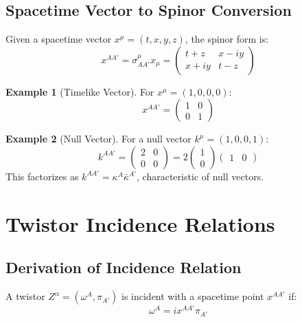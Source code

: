 \documentclass[12pt,a4paper]{article}
\theoremstyle{definition}
\newtheorem{example}{Example}[section]
\begin{document}
\subsection{Spacetime Vector to Spinor Conversion}

Given a spacetime vector $x^\mu = (t, x, y, z)$, the spinor form is:
\begin{equation}
x^{AA'} = \sigma^\mu_{AA'} x_\mu = \begin{pmatrix} t+z & x-iy \\ x+iy & t-z \end{pmatrix}
\end{equation}

\begin{example}[Timelike Vector]
For $x^\mu = (1, 0, 0, 0)$:
\begin{equation}
x^{AA'} = \begin{pmatrix} 1 & 0 \\ 0 & 1 \end{pmatrix}
\end{equation}
\end{example}

\begin{example}[Null Vector]
For a null vector $k^\mu = (1, 0, 0, 1)$:
\begin{equation}
k^{AA'} = \begin{pmatrix} 2 & 0 \\ 0 & 0 \end{pmatrix} = 2\begin{pmatrix} 1 \\ 0 \end{pmatrix} \begin{pmatrix} 1 & 0 \end{pmatrix}
\end{equation}
This factorizes as $k^{AA'} = \kappa^A \bar{\kappa}^{A'}$, characteristic of null vectors.
\end{example}

\section{Twistor Incidence Relations}

\subsection{Derivation of Incidence Relation}

A twistor $Z^\alpha = (\omega^A, \pi_{A'})$ is incident with a spacetime point $x^{AA'}$ if:
\begin{equation}
\omega^A = ix^{AA'}\pi_{A'}
\end{equation}
\end{document}

